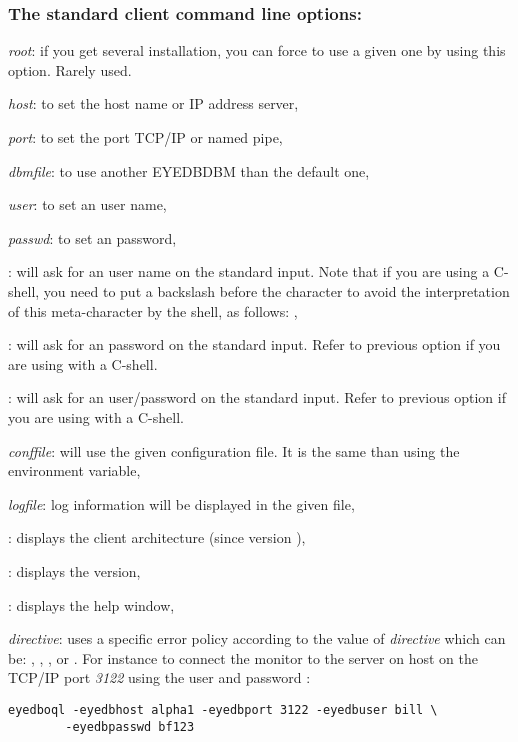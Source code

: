 \subsubsection{The standard client command line options:}
\bi
\item {} \emph{root}: if you get several \eyedb installation, you
can force to use a given one by using this option. Rarely used.
\item {} \emph{host}: to set the host name or IP address server,
\item {} \emph{port}: to set the port TCP/IP or named pipe,
\item {} \emph{dbmfile}: to use another EYEDBDBM than the default
one,
\item {} \emph{user}: to set an \eyedb user name,
\item {} \emph{passwd}: to set an \eyedb password,
\item {}: will ask for an \eyedb user name on
the standard input. Note that if you are using a C-shell, you need to
put a backslash before the  character to avoid the interpretation
of this meta-character by the shell,
as follows: ,
\item {}: will ask for an \eyedb password on
the standard input. Refer to previous option if you are using with a C-shell.
\item {}: will ask for an \eyedb user/password
on the standard input.  Refer to previous option if you are using with a C-shell.
\item {} \emph{conffile}: will use the given configuration file.
It is the same than using the  environment variable,
\item {} \emph{logfile}: log information will be displayed
in the given file,
\item {}: displays the client architecture (since version \eyedbversion),
\item {}: displays the \eyedb version,
\item {}: displays the help window,
\item {} \emph{directive}: uses a specific
error policy according to the value of \emph{directive} which can be:
,
, ,  or .
\ei
For instance to connect the  monitor to the \eyedb server
on host  on the TCP/IP port \emph{3122} using the \eyedb user
 and password :
\begin{verbatim}
eyedboql -eyedbhost alpha1 -eyedbport 3122 -eyedbuser bill \
        -eyedbpasswd bf123
\end{verbatim}
